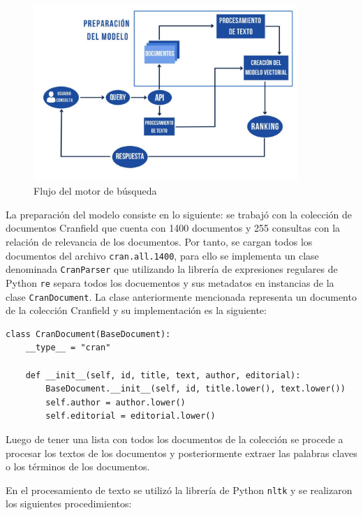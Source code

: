 \begin{figure}\label{esq}
    \includegraphics[width=10cm]{sections/img/esq.jpg}

    \caption{Flujo del motor de búsqueda}
\end{figure}

La preparación del modelo consiste en lo siguiente: se trabajó con la colección de documentos Cranfield \cite{cran} que cuenta con 1400 documentos y 255 consultas con la relación de relevancia de los documentos. Por tanto, se cargan todos los documentos del archivo \verb|cran.all.1400|, para ello se implementa un clase denominada \verb|CranParser| que utilizando la librería de expresiones regulares de Python \verb|re| separa todos los docuementos y sus metadatos en instancias de la clase \verb|CranDocument|. La clase anteriormente mencionada representa un documento de la colección Cranfield y su implementación es la siguiente:

\begin{verbatim}
class CranDocument(BaseDocument):
    __type__ = "cran"

    def __init__(self, id, title, text, author, editorial):
        BaseDocument.__init__(self, id, title.lower(), text.lower())
        self.author = author.lower()
        self.editorial = editorial.lower()
\end{verbatim}

Luego de tener una lista con todos los documentos de la colección se procede a procesar los textos de los documentos y posteriormente extraer las palabras claves o los términos de los documentos. 

En el procesamiento de texto se utilizó la librería de Python \verb|nltk| y se realizaron los siguientes procedimientos:

